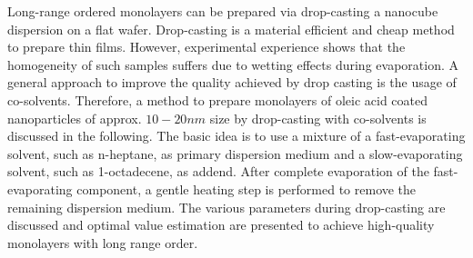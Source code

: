 \documentclass[\main/dresen_thesis.tex]{subfiles}
\begin{document}
  Long-range ordered monolayers can be prepared via drop-casting a nanocube dispersion on a flat wafer.
  Drop-casting is a material efficient and cheap method to prepare thin films.
  However, experimental experience shows that the homogeneity of such samples suffers due to wetting effects during evaporation.
  A general approach to improve the quality achieved by drop casting is the usage of co-solvents.
  Therefore, a method to prepare monolayers of oleic acid coated nanoparticles of approx. $10 - 20 \unit{nm}$ size by drop-casting with co-solvents is discussed in the following.
  The basic idea is to use a mixture of a fast-evaporating solvent, such as n-heptane, as primary dispersion medium and a slow-evaporating solvent, such as 1-octadecene, as addend.
  After complete evaporation of the fast-evaporating component, a gentle heating step is performed to remove the remaining dispersion medium.
  The various parameters during drop-casting are discussed and optimal value estimation are presented to achieve high-quality monolayers with long range order.
\end{document}
